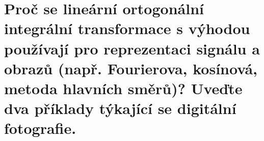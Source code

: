 \section{Proč se lineární ortogonální integrální transformace s výhodou používají pro reprezentaci signálu a obrazů 
(např. Fourierova, kosínová, metoda hlavních směrů)? Uveďte dva příklady týkající se digitální fotografie.}